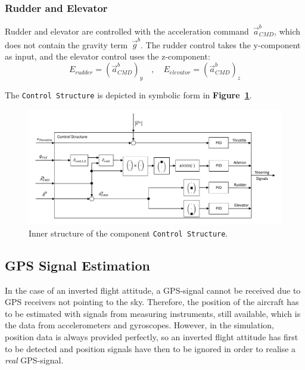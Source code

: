 \documentclass[11pt,a4paper]{scrartcl}		%
\begin{document}
\subsubsection*{Rudder and Elevator}
Rudder and elevator are controlled with the acceleration command~$\vec{a}_{CMD}^b$, which does not contain the gravity term~$\vec{g}^b$.
The rudder control takes the y-component as input, and the elevator control uses the z-component:
\begin{equation}
E_{rudder}=(\vec{a}_{CMD}^b)_y\quad , \quad E_{elevator} = (\vec{a}_{CMD}^b)_z
\end{equation}

The \texttt{Control Structure} is depicted in symbolic form in \textbf{Figure~\ref{fig_Control-Structure}}.

\begin{figure}[tbh]
  \begin{center}
  	\includegraphics[width=15cm]{pictures/PID.pdf}
  \end{center}
  \caption{Inner structure of the component \texttt{Control Structure}.}
  \label{fig_Control-Structure}
\end{figure}


\medskip






\subsection{GPS Signal Estimation}

In the case of an inverted flight attitude, a GPS-signal cannot be received due to GPS receivers not pointing to the sky.
Therefore, the position of the aircraft has to be estimated with signals from measuring instruments, still available, which is the data from accelerometers and gyroscopes.
However, in the simulation, position data is always provided perfectly, so an inverted flight attitude has first to be detected and position signals have then to be ignored in order to realise a \textsl{real} GPS-signal.
\end{document}
